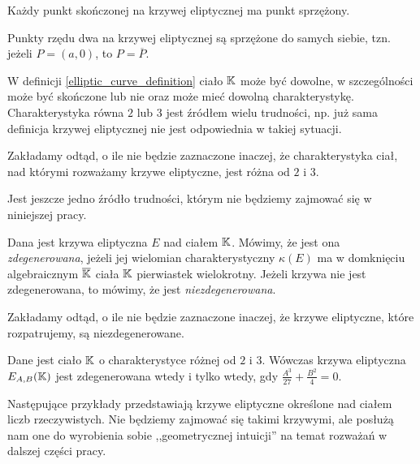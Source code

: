 \begin{fact}
Każdy punkt skończonej na krzywej eliptycznej ma punkt sprzężony.
\end{fact}

\begin{fact}
Punkty rzędu dwa na krzywej eliptycznej są sprzężone do samych siebie,
tzn. jeżeli $P = (a, 0)$, to $P = \overline{P}$.
\end{fact}

\noindent
W definicji \ref{elliptic_curve_definition} ciało $\mathbb{K}$ może być dowolne,
w szczególności może być skończone lub nie
oraz może mieć dowolną charakterystykę.
Charakterystyka równa $2$ lub $3$ jest źródłem wielu trudności,
np. już sama definicja krzywej eliptycznej
nie jest odpowiednia w takiej sytuacji.

\begin{remark}
Zakładamy odtąd, o ile nie będzie zaznaczone inaczej,
że charakterystyka ciał, nad którymi rozważamy krzywe eliptyczne,
jest różna od $2$ i $3$.
\end{remark}

\noindent
Jest jeszcze jedno źródło trudności,
którym nie będziemy zajmować się w niniejszej pracy.

\begin{definition}
Dana jest krzywa eliptyczna $E$ nad ciałem $\mathbb{K}$.
Mówimy, że jest ona \emph{zdegenerowana},
jeżeli jej wielomian charakterystyczny $\kappa(E)$
ma w domknięciu algebraicznym $\overline{\mathbb{K}}$ ciała $\mathbb{K}$
pierwiastek wielokrotny.
Jeżeli krzywa nie jest zdegenerowana,
to mówimy, że jest \emph{niezdegenerowana}.
\end{definition}

\begin{remark}
Zakładamy odtąd, o ile nie będzie zaznaczone inaczej,
że krzywe eliptyczne, które rozpatrujemy,
są niezdegenerowane.
\end{remark}

\begin{theorem}
Dane jest ciało $\mathbb{K}$ o charakterystyce różnej od $2$ i $3$.
Wówczas krzywa eliptyczna $E_{A,B}(\mathbb{K})$ jest zdegenerowana wtedy i tylko wtedy,
gdy $\frac{A^3}{27} + \frac{B^2}{4} = 0$.
\end{theorem}

\noindent
Następujące przykłady przedstawiają
krzywe eliptyczne określone nad ciałem liczb rzeczywistych.
Nie będziemy zajmować się takimi krzywymi,
ale posłużą nam one do wyrobienia sobie ,,geometrycznej intuicji''
na temat rozważań w dalszej części pracy.


